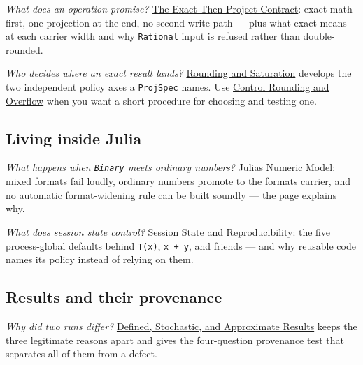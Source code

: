\emph{What does an operation promise?} \href{concept\_\allowbreak{}exact\_\allowbreak{}then\_\allowbreak{}project.md}{The Exact-Then-Project Contract}: exact math first, one projection at the end, no second write path — plus what {\textquotedbl}exact{\textquotedbl} means at each carrier width and why \texttt{Rational} input is refused rather than double-rounded.



\emph{Who decides where an exact result lands?} \href{concept\_\allowbreak{}rounding\_\allowbreak{}saturation.md}{Rounding and Saturation} develops the two independent policy axes a \texttt{ProjSpec} names. Use \href{workflow\_\allowbreak{}rounding\_\allowbreak{}overflow.md}{Control Rounding and Overflow} when you want a short procedure for choosing and testing one.



\subsection{Living inside Julia}



\label{4935307649337484772}{}


\emph{What happens when \texttt{Binary} meets ordinary numbers?} \href{concept\_\allowbreak{}julia\_\allowbreak{}numeric.md}{Julia{\textquotesingle}s Numeric Model}: mixed formats fail loudly, ordinary numbers promote to the format{\textquotesingle}s carrier, and no automatic format-widening rule can be built soundly — the page explains why.



\emph{What does session state control?} \href{concept\_\allowbreak{}session\_\allowbreak{}state.md}{Session State and Reproducibility}: the five process-global defaults behind \texttt{T(x)}, \texttt{x + y}, and friends — and why reusable code names its policy instead of relying on them.



\subsection{Results and their provenance}



\label{9090870915987971363}{}


\emph{Why did two runs differ?} \href{concept\_\allowbreak{}defined\_\allowbreak{}stochastic\_\allowbreak{}approximate.md}{Defined, Stochastic, and Approximate Results} keeps the three legitimate reasons apart and gives the four-question provenance test that separates all of them from a defect.



